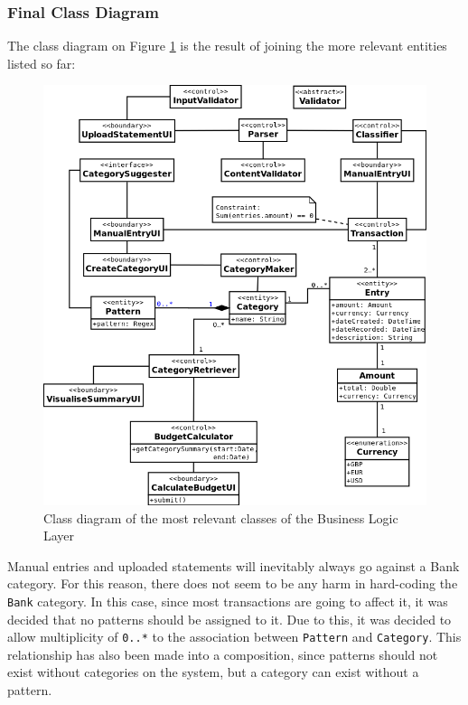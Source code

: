 \subsubsection{Final Class Diagram} \label{sec:AnalysisAndDesign.BusinessLogic.FinalClassDiagram}
The class diagram on Figure \ref{fig:ClassDiagram.AllClasses} is the result of
joining the more relevant entities listed so far:
\begin{figure}[ht!]
  \begin{center}
    \includegraphics[width=15cm]{./contents/img/Class_Diagram_-_All_Classes.png}
  \end{center}
  \caption{Class diagram of the most relevant classes of the Business Logic Layer}
  \label{fig:ClassDiagram.AllClasses}
\end{figure}
\FloatBarrier

Manual entries and uploaded statements will inevitably always go against a Bank
category. For this reason, there does not seem to be any harm in hard-coding
the \texttt{Bank} category. In this case, since most transactions are going to
affect it, it was decided that no patterns should be assigned to it. Due to
this, it was decided to allow multiplicity of \texttt{0..*} to the association
between \texttt{Pattern} and \texttt{Category}. This relationship has also been
made into a composition, since patterns should not exist without categories on
the system, but a category can exist without a pattern.


